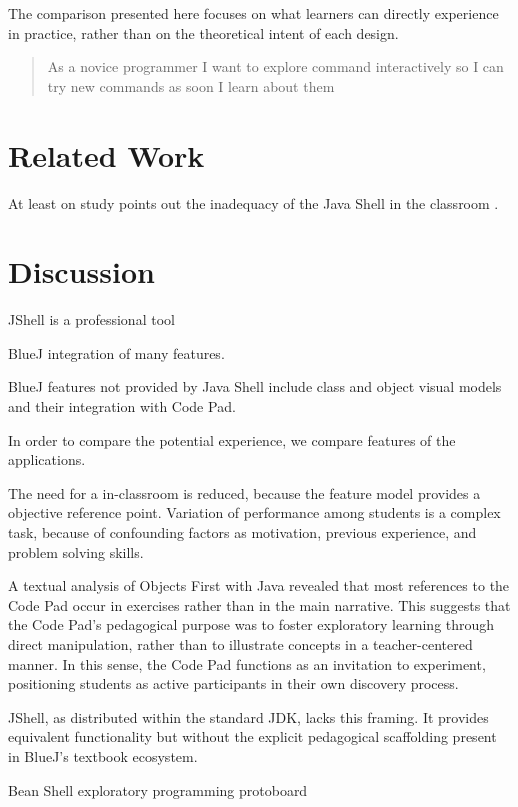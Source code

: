 \documentclass{article}
\begin{document}
The comparison presented here focuses on what learners can directly experience in practice, rather than on the theoretical intent of each design.

\begin{quote}
As a novice programmer
I want to explore command interactively
so I can try new commands as soon I learn about them
\end{quote}


\section{Related Work}

At least on study points out the inadequacy of the Java Shell in the classroom
\cite{politz_minnes2018jshell}.

\section{Discussion}

JShell is a professional tool

BlueJ integration of many features.

BlueJ features not provided by Java Shell include class and object visual models and their integration with Code Pad.

In order to compare the potential experience, we compare features of the applications.

The need for a in-classroom is reduced, because the feature model provides a objective reference point. Variation of performance among students is a complex task, because of confounding factors as motivation, previous experience, and problem solving skills.

A textual analysis of Objects First with Java revealed that most references to the Code Pad occur in exercises rather than in the main narrative. This suggests that the Code Pad’s pedagogical purpose was to foster exploratory learning through direct manipulation, rather than to illustrate concepts in a teacher-centered manner. In this sense, the Code Pad functions as an invitation to experiment, positioning students as active participants in their own discovery process.

JShell, as distributed within the standard JDK, lacks this framing. It provides equivalent functionality but without the explicit pedagogical scaffolding present in BlueJ’s textbook ecosystem.

Bean Shell exploratory programming
protoboard
\end{document}
